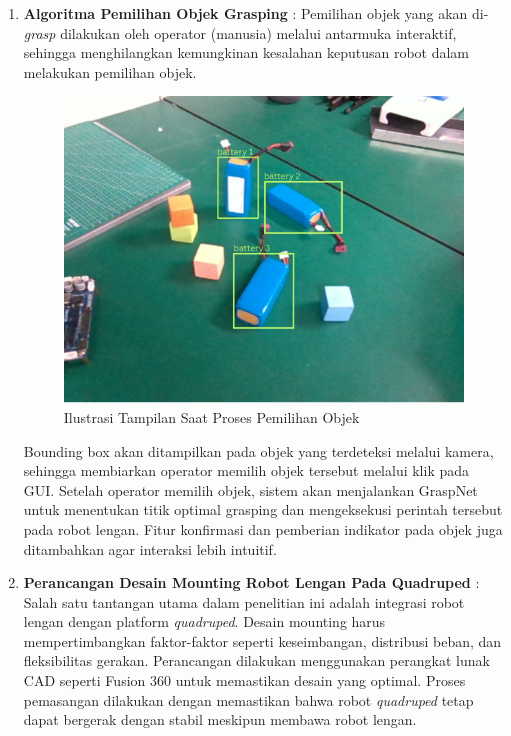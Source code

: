 \begin{enumerate}
  \item \textbf{Algoritma Pemilihan Objek Grasping} : Pemilihan objek yang akan di-\emph{grasp} dilakukan
  oleh operator (manusia) melalui antarmuka interaktif, sehingga menghilangkan kemungkinan kesalahan
  keputusan robot dalam melakukan pemilihan objek.
  \begin{figure} [H] \centering
    \includegraphics[scale=0.5]{gambar/pemilihan objek.png}
    \caption{Ilustrasi Tampilan Saat Proses Pemilihan Objek}
    \label{fig:pemilihan_objek}
  \end{figure}
  Bounding box akan ditampilkan pada objek yang terdeteksi
  melalui kamera, sehingga membiarkan operator memilih objek tersebut melalui klik pada GUI. Setelah operator
  memilih objek, sistem akan menjalankan GraspNet untuk menentukan titik optimal grasping dan
  mengeksekusi perintah tersebut pada robot lengan. Fitur konfirmasi dan pemberian indikator pada objek
  juga ditambahkan agar interaksi lebih intuitif.

  \item \textbf{Perancangan Desain Mounting Robot Lengan Pada Quadruped} : Salah satu tantangan utama dalam penelitian
  ini adalah integrasi robot lengan dengan platform \emph{quadruped}. Desain mounting harus mempertimbangkan faktor-faktor
  seperti keseimbangan, distribusi beban, dan fleksibilitas gerakan. Perancangan dilakukan menggunakan perangkat lunak CAD
  seperti Fusion 360 untuk memastikan desain yang optimal. Proses pemasangan dilakukan dengan memastikan bahwa robot
  \emph{quadruped} tetap dapat bergerak dengan stabil meskipun membawa robot lengan.


\end{enumerate}
